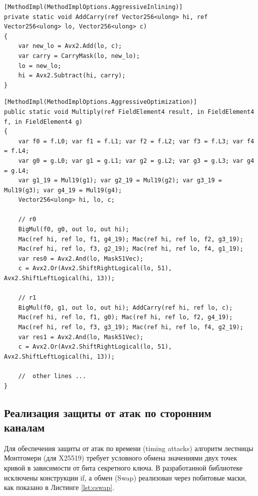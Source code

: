 \begin{lstlisting}[language={[Sharp]C}, caption={Вспомогательная функция для добавления переноса}, label={lst:sub}]
[MethodImpl(MethodImplOptions.AggressiveInlining)]
private static void AddCarry(ref Vector256<ulong> hi, ref Vector256<ulong> lo, Vector256<ulong> c)
{
    var new_lo = Avx2.Add(lo, c);
    var carry = CarryMask(lo, new_lo);
    lo = new_lo;
    hi = Avx2.Subtract(hi, carry);
}
\end{lstlisting}


\begin{lstlisting}[language={[Sharp]C}, caption={Фрагмент операции умножения}, label={lst:sub}]
[MethodImpl(MethodImplOptions.AggressiveOptimization)]
public static void Multiply(ref FieldElement4 result, in FieldElement4 f, in FieldElement4 g)
{
    var f0 = f.L0; var f1 = f.L1; var f2 = f.L2; var f3 = f.L3; var f4 = f.L4;
    var g0 = g.L0; var g1 = g.L1; var g2 = g.L2; var g3 = g.L3; var g4 = g.L4;
    var g1_19 = Mul19(g1); var g2_19 = Mul19(g2); var g3_19 = Mul19(g3); var g4_19 = Mul19(g4);
    Vector256<ulong> hi, lo, c;

    // r0
    BigMul(f0, g0, out lo, out hi);
    Mac(ref hi, ref lo, f1, g4_19); Mac(ref hi, ref lo, f2, g3_19);
    Mac(ref hi, ref lo, f3, g2_19); Mac(ref hi, ref lo, f4, g1_19);
    var res0 = Avx2.And(lo, Mask51Vec);
    c = Avx2.Or(Avx2.ShiftRightLogical(lo, 51), Avx2.ShiftLeftLogical(hi, 13));

    // r1   
    BigMul(f0, g1, out lo, out hi); AddCarry(ref hi, ref lo, c);
    Mac(ref hi, ref lo, f1, g0); Mac(ref hi, ref lo, f2, g4_19);
    Mac(ref hi, ref lo, f3, g3_19); Mac(ref hi, ref lo, f4, g2_19);
    var res1 = Avx2.And(lo, Mask51Vec);
    c = Avx2.Or(Avx2.ShiftRightLogical(lo, 51), Avx2.ShiftLeftLogical(hi, 13));

    //  other lines ...
}
\end{lstlisting}



\subsection{Реализация защиты от атак по сторонним каналам}

Для обеспечения защиты от атак по времени (timing attacks) алгоритм лестницы Монтгомери (для X25519) требует условного обмена значениями двух точек кривой в зависимости от бита секретного ключа. В разработанной библиотеке исключены конструкции if, а обмен (Swap) реализован через побитовые маски, как показано в Листинге \ref{lst:cswap}.

